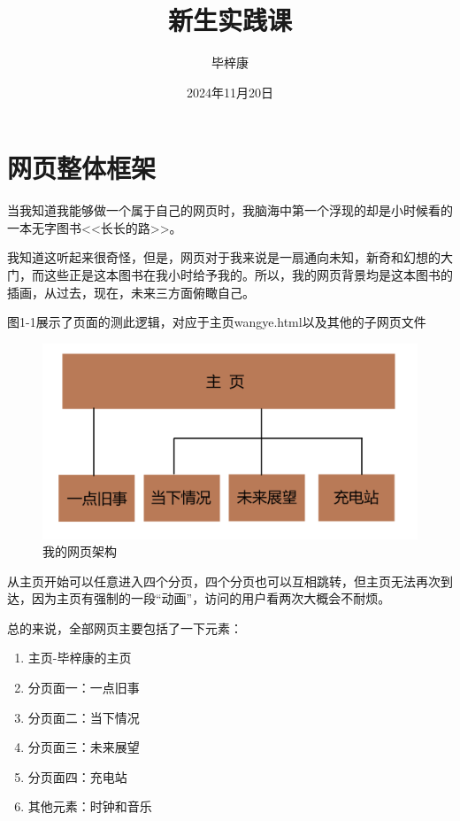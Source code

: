 \documentclass[supercite]{Experimental_Report}
\title{~~~~~~新生实践课~~~~~~}
\author{毕梓康}
\date{2024年11月20日}
\theoremstyle{definition}
\begin{document}
\maketitle

\clearpage


\tableofcontents[level=2]

\clearpage


\section{网页整体框架}

当我知道我能够做一个属于自己的网页时，我脑海中第一个浮现的却是小时候看的一本无字图书<<长长的路>>。

我知道这听起来很奇怪，但是，网页对于我来说是一扇通向未知，新奇和幻想的大门，而这些正是这本图书在我小时给予我的。所以，我的网页背景均是这本图书的插画，从过去，现在，未来三方面俯瞰自己。

图1-1展示了页面的测此逻辑，对应于主页wangye.html以及其他的子网页文件

\begin{figure}[htb] %
	\begin{center}
		\includegraphics[scale=0.30]{images/1-1.png}
		\caption{我的网页架构}
		\label{fig1-1}
	\end{center}
\end{figure}

从主页开始可以任意进入四个分页，四个分页也可以互相跳转，但主页无法再次到达，因为主页有强制的一段“动画”，访问的用户看两次大概会不耐烦。

总的来说，全部网页主要包括了一下元素：
\begin{enumerate}[label=(\arabic*)]
	\item 主页-毕梓康的主页
	\item 分页面一：一点旧事
	\item 分页面二：当下情况
	\item 分页面三：未来展望
	\item 分页面四：充电站
	\item 其他元素：时钟和音乐
\end{enumerate}
\end{document}
